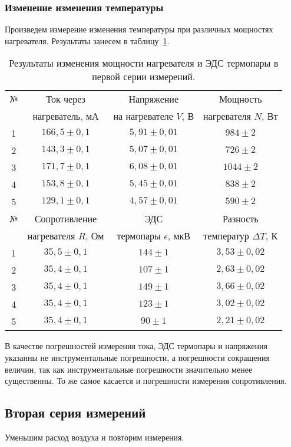\documentclass[a4paper,11pt]{article}
\begin{document}
\subsubsection{Изменение изменения температуры}
Произведем измерение изменения температуры при различных мощностях нагревателя.\newline
Результаты занесем в таблицу~\ref{table:tab2}.
\begin{table}[h!]
\centering
\begin{tabular}{ ||c|c|c|c|| }
  \hline
  № & Ток через & Напряжение & Мощность \\
   & нагреватель, $мА$ & на нагревателе $V$, $В$ & нагревателя $N$, $Вт$ \\
  \hline
  1 & $166,5 \pm 0,1$ & $5,91 \pm 0,01$ & $984 \pm 2$ \\
  2 & $143,3 \pm 0,1$ & $5,07 \pm 0,01$ & $726 \pm 2$ \\
  3 & $171,7 \pm 0,1$ & $6,08 \pm 0,01$ & $1044 \pm 2$ \\
  4 & $153,8 \pm 0,1$ & $5,45 \pm 0,01$ & $838 \pm 2$ \\
  5 & $129,1 \pm 0,1$ & $4,57 \pm 0,01$ & $590 \pm 2$ \\
  \hline\hline
  № & Сопротивление & ЭДС & Разность \\
   & нагревателя $R$, $Ом$ & термопары $\epsilon$, $мкВ$ & температур $\Delta T$, $К$ \\
  \hline
  1 & $35,5 \pm 0,1$ & $144 \pm 1$ & $3,53 \pm 0,02$ \\
  2 & $35,4 \pm 0,1$ & $107 \pm 1$ & $2,63 \pm 0,02$ \\
  3 & $35,4 \pm 0,1$ & $149 \pm 1$ & $3,66 \pm 0,02$ \\
  4 & $35,4 \pm 0,1$ & $123 \pm 1$ & $3,02 \pm 0,02$ \\
  5 & $35,4 \pm 0,1$ & $90 \pm 1$ & $2,21 \pm 0,02$ \\
  \hline
\end{tabular}
\caption{Результаты изменения мощности нагревателя и ЭДС термопары в первой серии измерений.}
\label{table:tab2}
\end{table}
\newline
В качестве погрешностей измерения тока, ЭДС термопары и напряжения указанны не инструментальные погрешности, а погрешности сокращения величин, так как инструментальные погрешности значительно менее существенны. То же самое касается и погрешности измерения сопротивления.
\subsection{Вторая серия измерений}
Уменьшим расход воздуха и повторим измерения.
\end{document}
